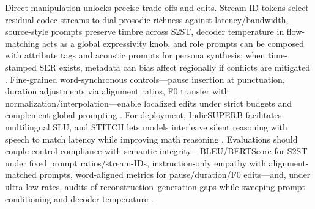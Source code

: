 \documentclass{article}
\begin{document}
Direct manipulation unlocks precise trade-offs and edits. Stream-ID tokens select residual codec streams to dial prosodic richness against latency/bandwidth, source-style prompts preserve timbre across S2ST, decoder temperature in flow-matching acts as a global expressivity knob, and role prompts can be composed with attribute tags and acoustic prompts for persona synthesis; when time-stamped SER exists, metadata can bias affect regionally if conflicts are mitigated \cite{peng2024mslms2stmultitaskspeechlanguagemodeltext,yuan2024continuousspeechtokensmakesllmsrobustmul,wang2024blspemotowardsempatheticlargespeechlangu,wang2025incorporatingcontextualparalinguisticund}. Fine-grained word-synchronous controls---pause insertion at punctuation, duration adjustments via alignment ratios, F0 transfer with normalization/interpolation---enable localized edits under strict budgets and complement global prompting \cite{huang2023holisticcascadesystembenchmarkhumanevalu}. For deployment, IndicSUPERB facilitates multilingual SLU, and STITCH lets models interleave silent reasoning with speech to match latency while improving math reasoning \cite{entry2025indicsuperbspeechprocessinguniversalperf,chiang2025stitchsimultaneousthinkingtalkingchunked}. Evaluations should couple control-compliance with semantic integrity---BLEU/BERTScore for S2ST under fixed prompt ratios/stream-IDs, instruction-only empathy with alignment-matched prompts, word-aligned metrics for pause/duration/F0 edits---and, under ultra-low rates, audits of reconstruction--generation gaps while sweeping prompt conditioning and decoder temperature \cite{wang2024blspemotowardsempatheticlargespeechlangu,huang2023holisticcascadesystembenchmarkhumanevalu}.
\end{document}

